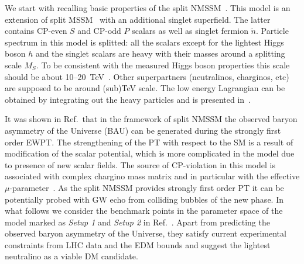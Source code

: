 \documentclass[12pt]{article}
\begin{document}
We start with recalling basic properties of the split
NMSSM~\cite{Demidov:2006zz,Demidov:2016wcv}. This model is an
extension of split MSSM~\cite{ArkaniHamed:2004fb,Giudice:2004tc} with
an additional singlet superfield. The latter contains CP-even $S$ and
CP-odd $P$ scalars as well as singlet fermion $\tilde{n}$. Particle
spectrum in this model is splitted: all the scalars except for the
lightest Higgs boson $h$ and the singlet scalars are heavy with their
masses around a splitting scale $M_S$. To be consistent with the
measured Higgs boson properties this scale should be about
10--20~TeV~\cite{Demidov:2016wcv}. Other superpartners (neutralinos,
charginos, etc) are supposed to
be around (sub)TeV scale. 
The low energy Lagrangian can be obtained by integrating out the heavy
particles and is presented in~\cite{Demidov:2006zz,Demidov:2016wcv}.

It was shown in Ref.\,\cite{Demidov:2016wcv} that in the framework of split
NMSSM  the observed baryon asymmetry of the Universe (BAU) can be 
generated during the strongly first order EWPT. The strengthening of the
PT with respect to the SM is a result of modification of the scalar
potential, which is more complicated in the model due to presence
  of new scalar fields.  
The source of CP-violation in this model  is associated with complex 
chargino mass matrix and in particular with the effective
$\mu$-parameter~\cite{Demidov:2006zz}. As the split NMSSM provides
strongly first order PT it can be potentially probed
with GW echo from colliding bubbles of the new phase. 
In what follows we consider the benchmark points in the parameter
space of the model marked as {\it Setup 1} and {\it Setup 2} in
Ref.~\cite{Demidov:2016wcv}.
Apart from predicting the
observed baryon asymmetry of the Universe,  they satisfy current
experimental constraints from LHC data and the EDM bounds and suggest
the lightest neutralino as a viable DM candidate.  
\end{document}
